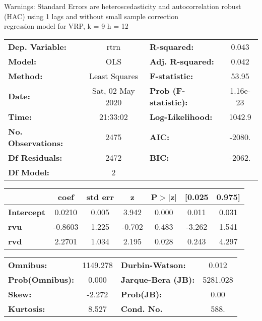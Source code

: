Warnings: \newline
 [1] Standard Errors are heteroscedasticity and autocorrelation robust (HAC) using 1 lags and without small sample correction\\ 

regression model for VRP, k = 9 h = 12\begin{center}
\begin{tabular}{lclc}
\toprule
\textbf{Dep. Variable:}    &       rtrn       & \textbf{  R-squared:         } &     0.043   \\
\textbf{Model:}            &       OLS        & \textbf{  Adj. R-squared:    } &     0.042   \\
\textbf{Method:}           &  Least Squares   & \textbf{  F-statistic:       } &     53.95   \\
\textbf{Date:}             & Sat, 02 May 2020 & \textbf{  Prob (F-statistic):} &  1.16e-23   \\
\textbf{Time:}             &     21:33:02     & \textbf{  Log-Likelihood:    } &    1042.9   \\
\textbf{No. Observations:} &        2475      & \textbf{  AIC:               } &    -2080.   \\
\textbf{Df Residuals:}     &        2472      & \textbf{  BIC:               } &    -2062.   \\
\textbf{Df Model:}         &           2      & \textbf{                     } &             \\
\bottomrule
\end{tabular}
\begin{tabular}{lcccccc}
                   & \textbf{coef} & \textbf{std err} & \textbf{z} & \textbf{P$> |$z$|$} & \textbf{[0.025} & \textbf{0.975]}  \\
\midrule
\textbf{Intercept} &       0.0210  &        0.005     &     3.942  &         0.000        &        0.011    &        0.031     \\
\textbf{rvu}       &      -0.8603  &        1.225     &    -0.702  &         0.483        &       -3.262    &        1.541     \\
\textbf{rvd}       &       2.2701  &        1.034     &     2.195  &         0.028        &        0.243    &        4.297     \\
\bottomrule
\end{tabular}
\begin{tabular}{lclc}
\textbf{Omnibus:}       & 1149.278 & \textbf{  Durbin-Watson:     } &    0.012  \\
\textbf{Prob(Omnibus):} &   0.000  & \textbf{  Jarque-Bera (JB):  } & 5281.028  \\
\textbf{Skew:}          &  -2.272  & \textbf{  Prob(JB):          } &     0.00  \\
\textbf{Kurtosis:}      &   8.527  & \textbf{  Cond. No.          } &     588.  \\
\bottomrule
\end{tabular}
\end{center}

